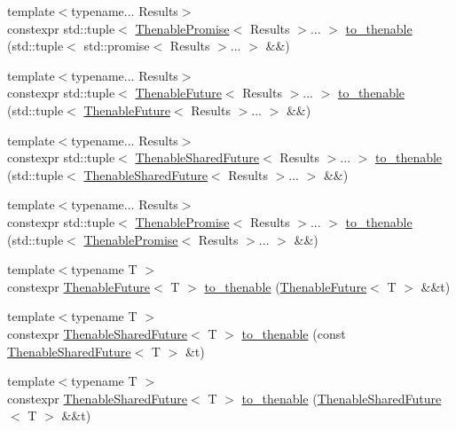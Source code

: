 \begin{DoxyCompactItemize}
\item 
{\footnotesize template$<$typename... Results$>$ }\\constexpr std\+::tuple$<$ \hyperlink{classthenable_1_1_thenable_promise}{Thenable\+Promise}$<$ Results $>$... $>$ \hyperlink{namespacethenable_a18e0e6c5b9a65bad51fb4351ef7bc587}{to\+\_\+thenable} (std\+::tuple$<$ std\+::promise$<$ Results $>$... $>$ \&\&)
\item 
{\footnotesize template$<$typename... Results$>$ }\\constexpr std\+::tuple$<$ \hyperlink{classthenable_1_1_thenable_future}{Thenable\+Future}$<$ Results $>$... $>$ \hyperlink{namespacethenable_a22cec8f52b9c37845ae5ae733898a106}{to\+\_\+thenable} (std\+::tuple$<$ \hyperlink{classthenable_1_1_thenable_future}{Thenable\+Future}$<$ Results $>$... $>$ \&\&)
\item 
{\footnotesize template$<$typename... Results$>$ }\\constexpr std\+::tuple$<$ \hyperlink{classthenable_1_1_thenable_shared_future}{Thenable\+Shared\+Future}$<$ Results $>$... $>$ \hyperlink{namespacethenable_a88f476e06ebe003343ceb2139897ab5b}{to\+\_\+thenable} (std\+::tuple$<$ \hyperlink{classthenable_1_1_thenable_shared_future}{Thenable\+Shared\+Future}$<$ Results $>$... $>$ \&\&)
\item 
{\footnotesize template$<$typename... Results$>$ }\\constexpr std\+::tuple$<$ \hyperlink{classthenable_1_1_thenable_promise}{Thenable\+Promise}$<$ Results $>$... $>$ \hyperlink{namespacethenable_a98c92776f4ed0bbe5316b978e575d011}{to\+\_\+thenable} (std\+::tuple$<$ \hyperlink{classthenable_1_1_thenable_promise}{Thenable\+Promise}$<$ Results $>$... $>$ \&\&)
\item 
{\footnotesize template$<$typename T $>$ }\\constexpr \hyperlink{classthenable_1_1_thenable_future}{Thenable\+Future}$<$ T $>$ \hyperlink{namespacethenable_a79883ce5869d4c3be2a76be8c0509e3d}{to\+\_\+thenable} (\hyperlink{classthenable_1_1_thenable_future}{Thenable\+Future}$<$ T $>$ \&\&t)
\item 
{\footnotesize template$<$typename T $>$ }\\constexpr \hyperlink{classthenable_1_1_thenable_shared_future}{Thenable\+Shared\+Future}$<$ T $>$ \hyperlink{namespacethenable_a1a414f7826f8a57f7ad134e09a8b864b}{to\+\_\+thenable} (const \hyperlink{classthenable_1_1_thenable_shared_future}{Thenable\+Shared\+Future}$<$ T $>$ \&t)
\item 
{\footnotesize template$<$typename T $>$ }\\constexpr \hyperlink{classthenable_1_1_thenable_shared_future}{Thenable\+Shared\+Future}$<$ T $>$ \hyperlink{namespacethenable_a5e7e45908f58bd51111c8286ca423101}{to\+\_\+thenable} (\hyperlink{classthenable_1_1_thenable_shared_future}{Thenable\+Shared\+Future}$<$ T $>$ \&\&t)

\end{DoxyCompactItemize}
